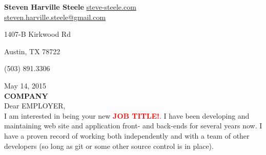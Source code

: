 \documentclass[11pt]{ncsuthesis4}
\begin{document}
\oddsidemargin 0.25in
\evensidemargin 0.25in
\textwidth 6.0in
\topmargin 0.25in
\textheight 8.0in
\renewcommand{\baselinestretch}{2}
\renewcommand{\headrulewidth}{0pt}
\thispagestyle{empty}
\rhead{\thepage}
\setlength{\headsep}{0in}
\setlength{\parindent}{2em}




\noindent \textbf{\Large Steven Harville Steele} \hfill \textcolor{blue}{\href{http://www.steve-steele.com}{steve-steele.com}}
\\

\hfill \href{mailto:steven.harville.steele@gmail.com}{steven.harville.steele@gmail.com}

\hfill 1407-B Kirkwood Rd

\hfill Austin, TX  78722

\hfill (503) 891.3306

\noindent May 14, 2015\\%

\noindent \textbf{COMPANY}\\%

\noindent Dear EMPLOYER,
\\




\noindent
I am interested in being your new \textcolor{red}{\textbf{JOB TITLE!}}. I have been developing and maintaining web site and application front- and back-ends for several years now. I have a proven record of working both independently and with a team of other developers (so long as git or some other source control is in place).
\\
\end{document}
